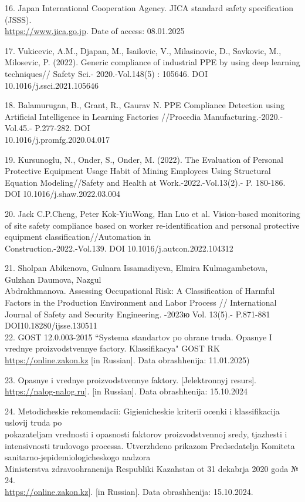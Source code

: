 \begin{references}
16. Japan International Cooperation Agency. JICA standard safety
specification (JSSS).\\
\href{https://www.jica.go.jp/Resource/english/our\_work/types\_of\_assistance/c8h0vm00008zx0m8-att/jsss\_01.pdf}{https://www.jica.go.jp}.
Date of access: 08.01.2025

17. Vukicevic, A.M., Djapan, M., Isailovic, V., Milasinovic, D.,
Savkovic, M., Milosevic, P. (2022). Generic compliance of industrial PPE
by using deep learning techniques// Safety Sci.-
2020.-Vol.148(5) : 105646. DOI 10.1016/j.ssci.2021.105646

18. Balamurugan, B., Grant, R., Gaurav N. PPE Compliance Detection using
Artificial Intelligence in Learning Factories //Procedia
Manufacturing.-2020.- Vol.45.- P.277-282. DOI\\
10.1016/j.promfg.2020.04.017

19. Kursunoglu, N., Onder, S., Onder, M. (2022). The Evaluation of
Personal Protective Equipment Usage Habit of Mining Employees Using
Structural Equation Modeling//Safety and Health at
Work.-2022.-Vol.13(2).- P. 180-186. DOI 10.1016/j.shaw.2022.03.004

20. Jack C.P.Cheng, Peter Kok-YiuWong, Han Luo et al. Vision-based
monitoring of site safety compliance based on worker re-identification
and personal protective equipment classification//Automation in\\
Construction.-2022.-Vol.139. DOI 10.1016/j.autcon.2022.104312

21. Sholpan Abikenova, Gulnara Issamadiyeva, Elmira Kulmagambetova,
Gulzhan Daumova, Nazgul \\Abdrakhmanova. Assessing Occupational Risk: A
Classification of Harmful Factors in the Production Environment and
Labor Process // International Journal of Safety and Security
Engineering. -2023ю Vol. 13(5).- P.871-881 DOI10.18280/ijsse.130511\\
22. GOST 12.0.003-2015 ``Systema standartov po ohrane truda. Opasnye I
vrednye proizvodstvennye factory. Klassifikacya" GOST RK
\href{https://online.zakon.kz/Document/?doc_id=34182412}{https://online.zakon.kz} {[}in
Russian{]}. Data obrashhenija: 11.01.2025)

23. Opasnye i vrednye proizvodstvennye faktory. {[}Jelektronnyj
resurs{]}.
\href{https://nalog-nalog.ru/ohrana_truda/opasnye_i_vrednye_proizvodstvennye_faktory_perechen}{https://nalog-nalog.ru}{]}.
{[}in Russian{]}. Data obrashhenija: 15.10.2024

24. Metodicheskie rekomendacii: Gigienicheskie kriterii ocenki i
klassifikacija uslovij truda po \\pokazateljam vrednosti i opasnosti
faktorov proizvodstvennoj sredy, tjazhesti i intensivnosti trudovogo
processa. Utverzhdeno prikazom Predsedatelja Komiteta
sanitarno-jepidemiologicheskogo nadzora \\Ministerstva zdravoohranenija
Respubliki Kazahstan ot 31 dekabrja 2020 goda № 24.\\
\href{https://online.zakon.kz/Document/?doc\_id=35193093}{https://online.zakon.kz}{]}. {[}in Russian{]}.
Data obrashhenija: 15.10.2024.


\end{references}
